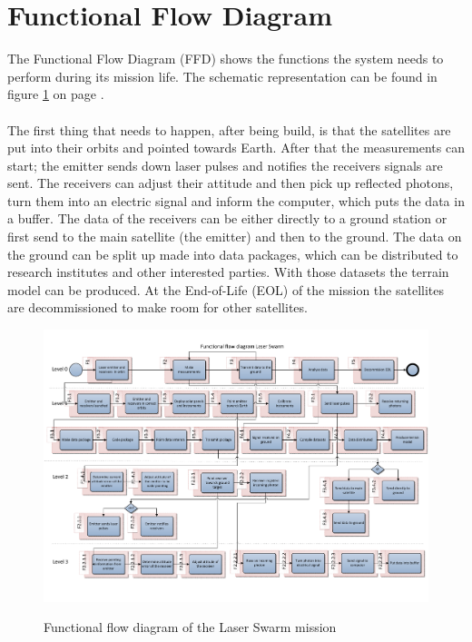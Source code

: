 \section{Functional Flow Diagram}
The Functional Flow Diagram (FFD) shows the functions the system needs to perform during its mission life. The schematic representation can be found in figure \ref{pic_FFD} on page \pageref{pic_FFD}.
\\ \\
The first thing that needs to happen, after being build, is that the satellites are put into their orbits and pointed towards Earth. After that the measurements can start; the emitter sends down laser pulses and notifies the receivers signals are sent. The receivers can adjust their attitude and then pick up reflected photons, turn them into an electric signal and inform the computer, which puts the data in a buffer. The data of the receivers can be either directly to a ground station or first send to the main satellite (the emitter) and then to the ground. The data on the ground can be split up made into data packages, which can be distributed to research institutes and other interested parties. With those datasets the terrain model can be produced. At the End-of-Life (EOL) of the mission the satellites are decommissioned to make room for other satellites.

\begin{figure}
\includegraphics[scale=0.7, angle=90]{img/pic_FFD.pdf}
\label{pic_FFD}
\caption{Functional flow diagram of the Laser Swarm mission}
\end{figure}

